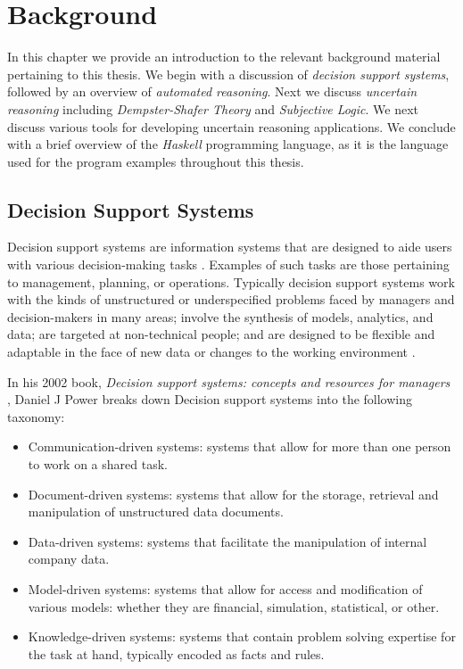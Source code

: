 \documentclass[thesis.tex]{subfiles}
\begin{document}
\chapter{Background}
\label{chap:background-information}

In this chapter we provide an introduction to the relevant background material pertaining
to this thesis. We begin with a discussion of \emph{decision support systems}, followed by
an overview of \emph{automated reasoning}. Next we discuss \emph{uncertain reasoning} including \emph{Dempster-Shafer Theory} and
\emph{Subjective Logic}. We next discuss various tools for developing uncertain reasoning applications. We conclude with
a brief overview of the \emph{Haskell} programming language, as it is the language used for the program
examples throughout this thesis.



\section{Decision Support Systems}
\label{sec:dss}

Decision support systems are information systems that are designed to aide users with various
decision-making tasks \cite{sprague1980framework}. Examples of such tasks are those pertaining to management,
planning, or operations. Typically decision support systems work with the kinds of unstructured
or underspecified problems faced by managers and decision-makers in many areas; involve the
synthesis of models, analytics, and data; are targeted at non-technical people; and are designed
to be flexible and adaptable in the face of new data or changes to the working environment
\cite{sprague1980framework}.

In his 2002 book, \emph{Decision support systems: concepts and resources for managers}
\cite{power2002decision}, Daniel J Power breaks down Decision support systems into the following
taxonomy:

\begin{itemize}
  \item Communication-driven systems: systems that allow for more than
    one person to work on a shared task.
  \item Document-driven systems: systems that allow for the storage,
    retrieval and manipulation of unstructured data documents.
  \item Data-driven systems: systems that facilitate the manipulation
    of internal company data.
  \item Model-driven systems: systems that allow for access and
    modification of various models: whether they are financial,
    simulation, statistical, or other.
  \item Knowledge-driven systems: systems that contain problem solving
    expertise for the task at hand, typically encoded as facts and
    rules.
\end{itemize}
\end{document}
